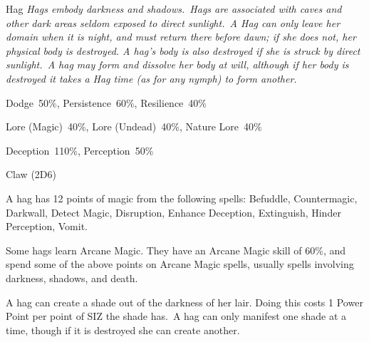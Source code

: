 \begin{monsterbox}{Hag}
	\textit{Hags embody darkness and shadows. Hags are associated with caves and other dark areas seldom exposed to direct sunlight. A Hag can only leave her domain when it is night, and must return there before dawn; if she does not, her physical body is destroyed. A hag’s body is also destroyed if she is struck by direct sunlight. A hag may form and dissolve her body at will, although if her body is destroyed it takes a Hag time (as for any nymph) to form another.}\\
	\rpghline
	\basics[%
        hitpoints  = 11, 
	majorwound = 6,
	damagemodifier = +1D6,
	powerpoints = 22,
	movementrate = 15m,
	armor = None,
	plunderrating = 3
	]
	\rpghline%
	\stats[ %
		STR = 6D6    (21),
		CON = 3D6    (11),
		DEX = 3D6    (11),
		SIZ = 3D6    (11),
		INT = 2D6+12 (19),
		POW = 2D6+21 (28),
		CHA = 1D6    (3)
	]
	\rpghline%
	\begin{rpg-monsteraction}[Resistances]
		Dodge~50\%, Persistence~60\%, Resilience~40\%
	\end{rpg-monsteraction}
	\begin{rpg-monsteraction}[Knowledge]
		Lore (Magic)~40\%, Lore (Undead)~40\%, Nature Lore~40\%
	\end{rpg-monsteraction}
	\begin{rpg-monsteraction}[Practical]
		Deception~110\%, Perception~50\%
	\end{rpg-monsteraction}
	\begin{rpg-monsteraction}
		Claw (2D6)
	\end{rpg-monsteraction}
	\begin{rpg-monsteraction}[Magic 75\%]
		A hag has 12 points of magic from the following spells: Befuddle, Countermagic, Darkwall, Detect Magic, Disruption, Enhance Deception, Extinguish, Hinder Perception, Vomit.
	\end{rpg-monsteraction}
	\begin{rpg-monsteraction}
		Some hags learn Arcane Magic. They have an Arcane Magic skill of 60\%, and spend some of the above points on Arcane Magic spells, usually spells involving darkness, shadows, and death.
	\end{rpg-monsteraction}
	\begin{rpg-monsteraction}
		A hag can create a shade out of the darkness of her lair. Doing this costs 1 Power Point per point of SIZ the shade has. A hag can only manifest one shade at a time, though if it is destroyed she can create another.
	\end{rpg-monsteraction}

\end{monsterbox}

